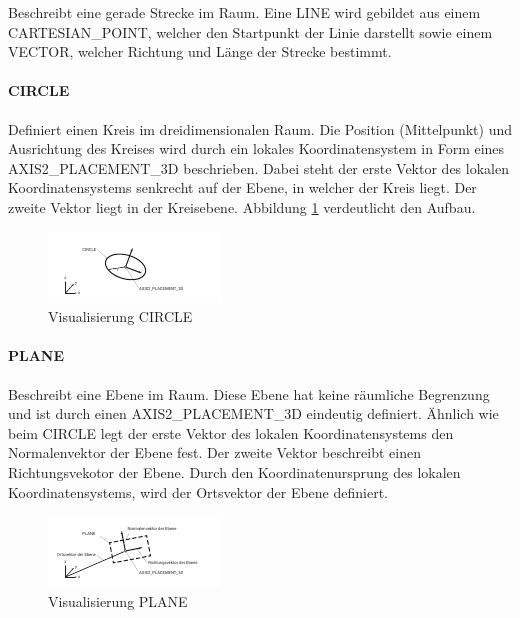 Beschreibt eine gerade Strecke im Raum. Eine LINE wird gebildet aus einem CARTESIAN\_POINT, welcher den Startpunkt der Linie darstellt sowie einem VECTOR, welcher Richtung und Länge der Strecke bestimmt. 

\paragraph{CIRCLE}

Definiert einen Kreis im dreidimensionalen Raum. Die Position (Mittelpunkt) und Ausrichtung des Kreises wird durch ein lokales Koordinatensystem in Form eines AXIS2\_PLACEMENT\_3D beschrieben. Dabei steht der erste Vektor des lokalen Koordinatensystems senkrecht auf der Ebene, in welcher der Kreis liegt. Der zweite Vektor liegt in der Kreisebene. Abbildung \ref{fig:circleentity} verdeutlicht den Aufbau. 

\begin{figure}[h]
	\centering
	
	\includegraphics[width=0.7\linewidth]{img/circle_entity.pdf}
	
	\caption{Visualisierung CIRCLE}
	\label{fig:circleentity}
\end{figure} 

\paragraph{PLANE}

Beschreibt eine Ebene im Raum. Diese Ebene hat keine räumliche Begrenzung und ist durch einen AXIS2\_PLACEMENT\_3D eindeutig definiert. Ähnlich wie beim CIRCLE legt der erste Vektor des lokalen Koordinatensystems den Normalenvektor der Ebene fest. Der zweite Vektor beschreibt einen Richtungsvekotor der Ebene. Durch den Koordinatenursprung des lokalen Koordinatensystems, wird der Ortsvektor der Ebene definiert. 

\begin{figure}[h]
	\centering
	
	\includegraphics[width=0.7\linewidth]{img/plane_entity.pdf}
	
	
	\caption{Visualisierung PLANE}
	
\end{figure} 

